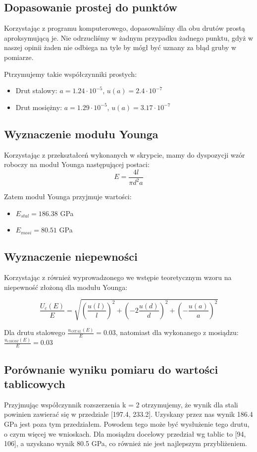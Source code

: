 \documentclass{article}
\begin{document}
\subsection{Dopasowanie prostej do punktów}
Korzystając z programu komputerowego, dopasowaliśmy dla obu drutów prostą aproksymującą je. Nie odrzucliśmy w żadnym przypadku żadnego punktu, gdyż w naszej opinii żaden nie odbiega na tyle by mógł być uznany za błąd gruby w pomiarze.

Ptrzymujemy takie współczynniki prostych:
\begin{itemize}
	\item Drut stalowy: $a = 1.24 \cdot 10^{-5}$, $u(a) = 2.4 \cdot 10^{-7}$
	\item Drut mosiężny: $a = 1.29 \cdot 10^{-5}$, $u(a) = 3.17 \cdot 10^{-7}$
\end{itemize}

\subsection{Wyznaczenie modułu Younga}
Korzystając z przekształceń wykonanych w skrypcie, mamy do dyspozycji wzór roboczy na moduł Younga następującej postaci:
\begin{equation}
	E = \frac{4l}{\pi d^{2} a}
\end{equation}

Zatem moduł Younga przyjmuje wartości:
\begin{itemize}
	\item $E_{stal} = 186.38 $ GPa
	\item $E_{mosi} = 80.51 $ GPa
\end{itemize}

\subsection{Wyznaczenie niepewności}
Korzystając z również wyprowadzonego we wstępie teoretycznym wzoru na niepewność złożoną dla modułu Younga:

\begin{equation}
	\frac{U_{c}(E)}{E} = \sqrt{(\frac{u(l)}{l})^{2}+(-2\frac{u(d)}{d})^{2}+(-\frac{u(a)}{a})^{2}}
\end{equation}

Dla drutu stalowego $\frac{u_{cSTAL}(E)}{E} = 0.03$, natomiast dla wykonanego z mosiądzu: $\frac{u_{cMOSI}(E)}{E} = 0.03$

\subsection{Porównanie wyniku pomiaru do wartości tablicowych}
Przyjmując współczynnik rozszerzenia k = 2 otrzymujemy, że wynik dla stali powinien zawierać się w przedziale [197.4, 233.2]. Uzyskany przez nas wynik 186.4 GPa jest poza tym przedziałem. Powodem tego może być wysłużenie tego drutu, o czym więcej we wnioskach.
Dla mosiądzu docelowy przedział wg tablic to [94, 106], a uzyskano wynik 80.5 GPa, co również nie jest najlepszym przybliżeniem.
\end{document}
